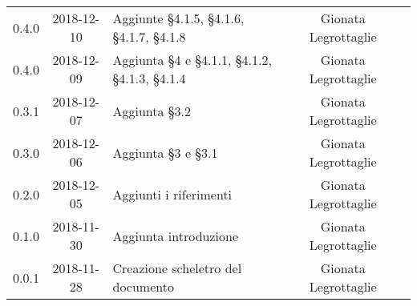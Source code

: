 {\begin{longtable}{ c c C{4cm} c c }
		0.4.0 & 2018-12-10 & Aggiunte §4.1.5, §4.1.6, §4.1.7, §4.1.8 & Gionata Legrottaglie & \reda{} \\ 
		0.4.0 & 2018-12-09 & Aggiunta §4 e §4.1.1, §4.1.2, §4.1.3, §4.1.4 & Gionata Legrottaglie & \reda{} \\ 
		
		0.3.1 & 2018-12-07 & Aggiunta §3.2 & Gionata Legrottaglie & \reda{} \\ 
		
		0.3.0 & 2018-12-06 & Aggiunta §3 e §3.1 & Gionata Legrottaglie & \reda{} \\ 
		
		0.2.0 & 2018-12-05 & Aggiunti i riferimenti & Gionata Legrottaglie & \reda{} \\ 
		
		0.1.0 & 2018-11-30 & Aggiunta introduzione & Gionata Legrottaglie & \reda{} \\
		
		0.0.1 & 2018-11-28 & Creazione scheletro del documento & Gionata Legrottaglie & \reda{}\\
		
	\end{longtable}

}